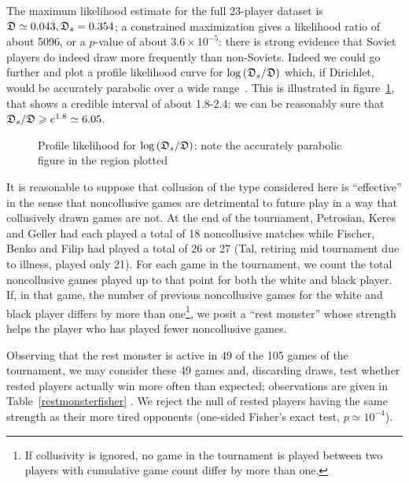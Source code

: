 \documentclass[review]{elsarticle}
\begin{document}
The maximum likelihood estimate for the full 23-player dataset is
$\mathfrak{D}\simeq 0.043, \mathfrak{D}_s=0.354$; a constrained maximization gives a
likelihood ratio of about 5096, or a $p$-value of about $3.6\times
10^{-5}$: there is strong evidence that Soviet players do indeed draw
more frequently than non-Soviets.  Indeed we could go further and plot
a profile likelihood curve for
$\log\left(\mathfrak{D}_s/\mathfrak{D}\right)$ which, if Dirichlet, would be
accurately parabolic over a wide range~\cite[page 343]{ohagan2004}.
This is illustrated in figure~\ref{proflike}, that shows a credible
interval of about 1.8-2.4: we can be reasonably sure that
$\mathfrak{D}_s/\mathfrak{D}\geqslant e^{1.8}\simeq 6.05$.


\begin{figure}[htbp]
\begin{center}
\caption{Profile likelihood \label{proflike} for 
  $\log\left(\mathfrak{D}_s/\mathfrak{D}\right)$: note the accurately parabolic figure in
  the region plotted}
  \end{center}
\end{figure}



It is reasonable to suppose that collusion of
  the type considered here is ``effective'' in the sense that
  noncollusive games are detrimental to future play in a way that
  collusively drawn games are not.  At the end of the tournament,
  Petrosian, Keres and Geller had each played a total of 18
  noncollusive matches while Fischer, Benko and Filip had played a
  total of 26 or 27 (Tal, retiring mid tournament due to illness,
  played only 21).  For each game in the tournament, we count the
  total noncollusive games played up to that point for both the white
  and black player.  If, in that game, the number of previous
  noncollusive games for the white and black player differs by more
  than one\footnote{If collusivity is ignored,
    no game in the tournament is played between two players with
    cumulative game count differ by more than one.}, we posit a ``rest
  monster'' whose strength helps the player who has played fewer
  noncollusive games.


  Observing that the rest monster is
  active in 49 of the 105 games of the tournament, we may consider
  these 49 games and, discarding draws, test whether rested players
  actually win more often than expected; observations are given in
  Table~\ref{restmonsterfisher} .  We reject the null of rested
  players having the same strength as their more tired opponents
  (one-sided Fisher's exact test, $p\simeq 10^{-4}$).
\end{document}
